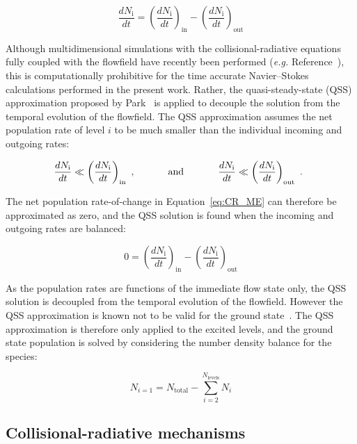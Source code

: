 \begin{equation}
 \frac{dN_\text{i}}{dt} = \left ( \frac{dN_\text{i}}{dt} \right )_\text{in} - \left ( \frac{dN_\text{i}}{dt} \right )_\text{out} \label{eq:CR_ME}
\end{equation}

Although multidimensional simulations with the collisional-radiative equations fully coupled with the flowfield have recently been performed (\textit{e.g.} Reference~\cite{panesi_phd}), this is computationally prohibitive for the time accurate Navier--Stokes calculations performed in the present work.
Rather, the quasi-steady-state (QSS) approximation proposed by Park~\cite{park_1990} is applied to decouple the solution from the temporal evolution of the flowfield.
The QSS approximation assumes the net population rate of level $i$ to be much smaller than the individual incoming and outgoing rates:

\begin{equation}
 \frac{dN_\text{i}}{dt} \ll \left ( \frac{dN_\text{i}}{dt} \right )_\text{in} \text{ , \hspace{1cm} and \hspace{1cm} }  \frac{dN_\text{i}}{dt} \ll \left ( \frac{dN_\text{i}}{dt} \right )_\text{out} \text{ . }\nonumber
\end{equation}

The net population rate-of-change in Equation~\ref{eq:CR_ME} can therefore be approximated as zero, and the QSS solution is found when the incoming and outgoing rates are balanced:

\begin{equation}
 0 = \left ( \frac{dN_\text{i}}{dt} \right )_\text{in} - \left ( \frac{dN_\text{i}}{dt} \right )_\text{out} \label{eq:QSS_condition}
\end{equation}

As the population rates are functions of the immediate flow state only, the QSS solution is decoupled from the temporal evolution of the flowfield.
However the QSS approximation is known not to be valid for the ground state~\cite{park_1990}.
The QSS approximation is therefore only applied to the excited levels, and the ground state population is solved by considering the number density balance for the species:

\begin{equation}
 N_{i=1} = N_\text{total} - \sum_{i=2}^{N_\text{levels}} N_i \label{eq:QSS_closure}
\end{equation}

\subsection{Collisional-radiative mechanisms}

